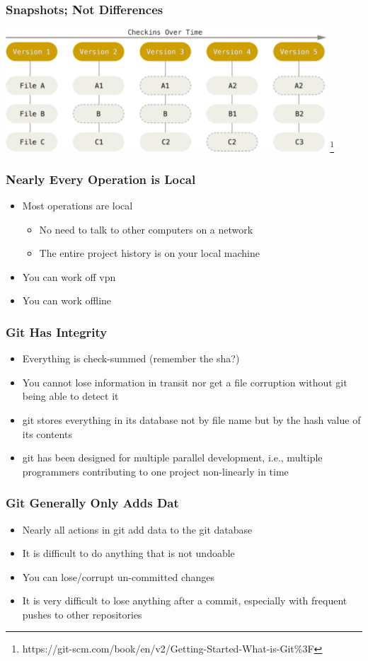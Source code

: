 \begin{frame}
  \frametitle{Snapshots; Not Differences}
  \centering
  \includegraphics[width=0.90\textwidth]{snapshots}
  \footnote{https://git-scm.com/book/en/v2/Getting-Started-What-is-Git\%3F}
\end{frame}

\begin{frame}
  \frametitle{Nearly Every Operation is Local}
  \begin{itemize}
    \item Most operations are local
      \begin{itemize}
        \item No need to talk to other computers on a network
        \item The entire project history is on your local machine
      \end{itemize}
    \item You can work off vpn
    \item You can work offline
  \end{itemize}
\end{frame}

\begin{frame}
  \frametitle{Git Has Integrity}
  \begin{itemize}
    \item Everything is check-summed (remember the sha?)
    \item You cannot lose information in transit nor get a file corruption
      without git being able to detect it
    \item git stores everything in its database not by file name but by the hash
      value of its contents
    \item git has been designed for multiple parallel development, i.e.,
      multiple programmers contributing to one project non-linearly in time
  \end{itemize}
\end{frame}

\begin{frame}
  \frametitle{Git Generally Only Adds Dat}
  \begin{itemize}
    \item Nearly all actions in git add data to the git database
    \item It is difficult to do anything that is not undoable
    \item You can lose/corrupt un-committed changes
    \item It is very difficult to lose anything after a commit, especially with
      frequent pushes to other repositories
  \end{itemize}
\end{frame}

